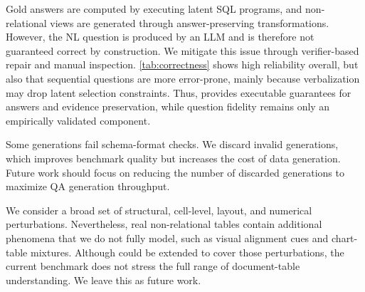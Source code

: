 Gold answers are computed by executing latent SQL programs, and non-relational views are generated through answer-preserving transformations.
However, the NL question is produced by an LLM and is therefore not guaranteed correct by construction. We mitigate this issue through verifier-based repair and manual inspection.
\autoref{tab:correctness} shows high reliability overall, but also that sequential questions are more error-prone, mainly because verbalization may drop latent selection constraints. Thus, \name provides executable guarantees for answers and evidence preservation, while question fidelity remains only an empirically validated component.

Some generations fail schema-format checks. We discard invalid generations, which improves benchmark quality but increases the cost of data generation. %
Future work should focus on reducing the number of discarded generations to maximize QA generation throughput.

We consider a broad set of structural, cell-level, layout, and numerical perturbations. Nevertheless, real non-relational tables contain additional phenomena that we do not fully model, such as visual alignment cues and chart-table mixtures. Although \name{} could be extended to cover those perturbations, the current benchmark does not stress the full range of document-table understanding.  We leave this as future work.


